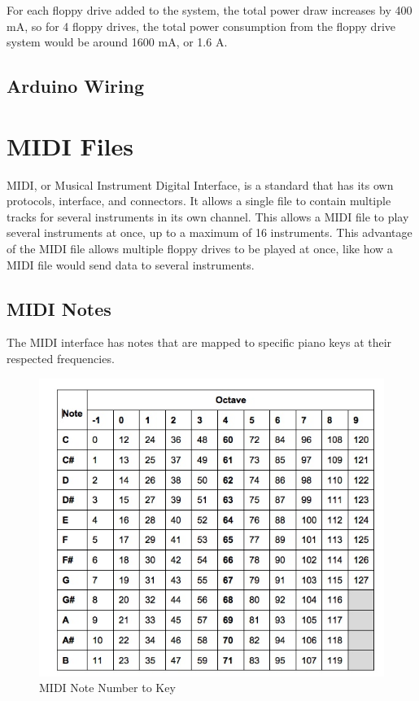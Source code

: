 \documentclass[11pt, a4paper]{report}
\begin{document}
For each floppy drive added to the system, the total power draw increases by 400 mA, so for 4 floppy drives, the total power consumption from the floppy drive system would be around 1600 mA, or 1.6 A. 
  
\section{Arduino Wiring}


\chapter{MIDI Files}

  MIDI, or Musical Instrument Digital Interface, is a standard that has its own protocols, interface, and connectors. It allows a single file to contain multiple tracks for several instruments in its own channel. This allows a MIDI file to play several instruments at once, up to a maximum of 16 instruments. This advantage of the MIDI file allows multiple floppy drives to be played at once, like how a MIDI file would send data to several instruments. 

\section{MIDI Notes}

The MIDI interface has notes that are mapped to specific piano keys at their respected frequencies. 
\begin{figure}[H]
\hspace*{-2cm}    
    \centering
    \includegraphics[width=.75\textwidth]{midi_notechart.jpg}
    \caption{MIDI Note Number to Key}
\end{figure}
\end{document}
